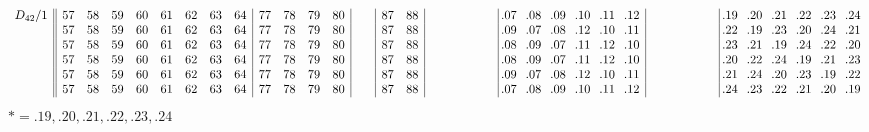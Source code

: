 \documentclass[12pt,a4paper]{amsart}
\begin{document}
\begin{align*}
\begin{array}{r||cccccccc|cccc|cc|cc|cccccc|cccccc|cccccc|cccccc}
D_{42}/1&
57&58&59&60&61&62&63&64&77&78&79&80&  &  &87&88&  &  &  &  &&&\llap{.}07&\llap{.}08&\llap{.}09&\llap{.}10&\llap{.}11&\llap{.}12&  &  &&&&&\llap{.}19&\llap{.}20&\llap{.}21&\llap{.}22&\llap{.}23&\llap{.}24\\
&
57&58&59&60&61&62&63&64&77&78&79&80&  &  &87&88&  &  &  &  &&&\llap{.}09&\llap{.}07&\llap{.}08&\llap{.}12&\llap{.}10&\llap{.}11&  &  &&&&&\llap{.}22&\llap{.}19&\llap{.}23&\llap{.}20&\llap{.}24&\llap{.}21\\
&
57&58&59&60&61&62&63&64&77&78&79&80&  &  &87&88&  &  &  &  &&&\llap{.}08&\llap{.}09&\llap{.}07&\llap{.}11&\llap{.}12&\llap{.}10&  &  &&&&&\llap{.}23&\llap{.}21&\llap{.}19&\llap{.}24&\llap{.}22&\llap{.}20\\
&
57&58&59&60&61&62&63&64&77&78&79&80&  &  &87&88&  &  &  &  &&&\llap{.}08&\llap{.}09&\llap{.}07&\llap{.}11&\llap{.}12&\llap{.}10&  &  &&&&&\llap{.}20&\llap{.}22&\llap{.}24&\llap{.}19&\llap{.}21&\llap{.}23\\
&
57&58&59&60&61&62&63&64&77&78&79&80&  &  &87&88&  &  &  &  &&&\llap{.}09&\llap{.}07&\llap{.}08&\llap{.}12&\llap{.}10&\llap{.}11&  &  &&&&&\llap{.}21&\llap{.}24&\llap{.}20&\llap{.}23&\llap{.}19&\llap{.}22\\
&
57&58&59&60&61&62&63&64&77&78&79&80&  &  &87&88&  &  &  &  &&&\llap{.}07&\llap{.}08&\llap{.}09&\llap{.}10&\llap{.}11&\llap{.}12&  &  &&&&&\llap{.}24&\llap{.}23&\llap{.}22&\llap{.}21&\llap{.}20&\llap{.}19\\
\end{array}
\end{align*}
$* = {.}19,{.}20,{.}21,{.}22,{.}23,{.}24$
\end{document}
